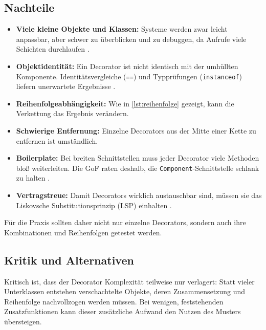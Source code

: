 \documentclass[a4paper,11pt,toc=listof,toc=bibliography]{scrartcl}
\begin{document}
\subsection{Nachteile}
\begin{itemize}
  \item \textbf{Viele kleine Objekte und Klassen:} Systeme werden zwar leicht anpassbar, aber schwer zu überblicken und zu debuggen, da Aufrufe viele Schichten durchlaufen \cite{GHJV94}.
  \item \textbf{Objektidentität:} Ein Decorator ist nicht identisch mit der umhüllten Komponente. Identitätsvergleiche (\texttt{==}) und Typprüfungen (\texttt{instanceof}) liefern unerwartete Ergebnisse \cite{GHJV94}.
  \item \textbf{Reihenfolgeabhängigkeit:} Wie in \autoref{lst:reihenfolge} gezeigt, kann die Verkettung das Ergebnis verändern.
  \item \textbf{Schwierige Entfernung:} Einzelne Decorators aus der Mitte einer Kette zu entfernen ist umständlich.
  \item \textbf{Boilerplate:} Bei breiten Schnittstellen muss jeder Decorator viele Methoden bloß weiterleiten. Die \acs{GoF} raten deshalb, die \texttt{Component}-Schnittstelle schlank zu halten \cite{GHJV94}.
  \item \textbf{Vertragstreue:} Damit Decorators wirklich austauschbar sind, müssen sie das Liskovsche Substitutionsprinzip (\acs{LSP}) einhalten \cite{LW94}.
\end{itemize}

Für die Praxis sollten daher nicht nur einzelne Decorators, sondern auch ihre Kombinationen und Reihenfolgen getestet werden.

\subsection{Kritik und Alternativen}
Kritisch ist, dass der Decorator Komplexität teilweise nur verlagert: Statt vieler Unterklassen entstehen verschachtelte Objekte, deren Zusammensetzung und Reihenfolge nachvollzogen werden müssen. Bei wenigen, feststehenden Zusatzfunktionen kann dieser zusätzliche Aufwand den Nutzen des Musters übersteigen.
\end{document}
